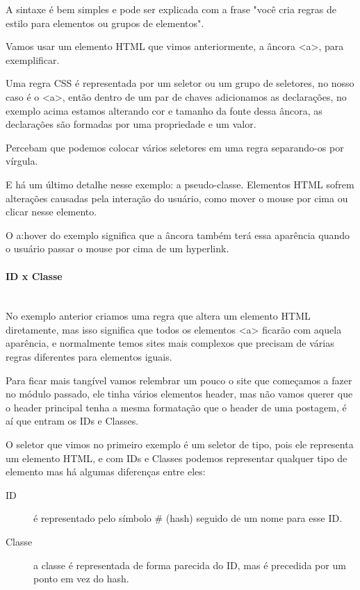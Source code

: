 \documentclass[12pt,a4paper]{article}
\begin{document}
	A sintaxe é bem simples e pode ser explicada com a frase "você cria regras de estilo para elementos ou grupos de elementos".
	
	Vamos usar um elemento HTML que vimos anteriormente, a âncora <a>, para exemplificar.
	
	Uma regra CSS é representada por um seletor ou um grupo de seletores, no nosso caso é o <a>, então dentro de um par de chaves adicionamos as declarações, no exemplo acima estamos alterando cor e tamanho da fonte dessa âncora, as declarações são formadas por uma propriedade e um valor.
	
	Percebam que podemos colocar vários seletores em uma regra separando-os por vírgula.
	
	E há um último detalhe nesse exemplo: a pseudo-classe. Elementos HTML sofrem alterações causadas pela interação do usuário, como mover o mouse por cima ou clicar nesse elemento.
	
	O a:hover do exemplo significa que a âncora também terá essa aparência quando o usuário passar o mouse por cima de um hyperlink.
	
	\paragraph{ID x Classe} \mbox{} \\
	
	No exemplo anterior criamos uma regra que altera um elemento HTML diretamente, mas isso significa que todos os elementos <a> ficarão com aquela aparência, e normalmente temos sites mais complexos que precisam de várias regras diferentes para elementos iguais.
	
	Para ficar mais tangível vamos relembrar um pouco o site que começamos a fazer no módulo passado, ele tinha vários elementos header, mas não vamos querer que o header principal tenha a mesma formatação que o header de uma postagem, é aí que entram os IDs e Classes.
	
	O seletor que vimos no primeiro exemplo é um seletor de tipo, pois ele representa um elemento HTML, e com IDs e Classes podemos representar qualquer tipo de elemento mas há algumas diferenças entre eles:
	
	\begin{description}
		\item[ID] é representado pelo símbolo \# (hash) seguido de um nome para esse ID.
		
		\item[Classe] a classe é representada de forma parecida do ID, mas é precedida por um ponto em vez do hash.
	\end{description} 
	
\end{document}
